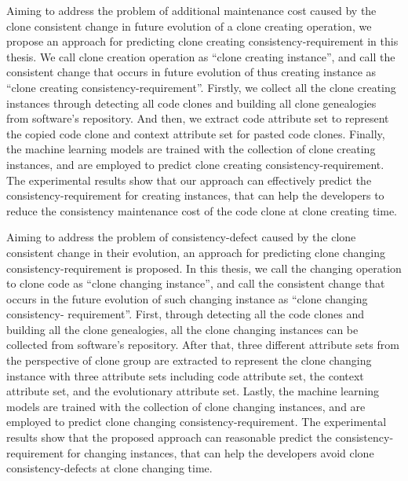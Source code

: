 {Aiming to address the problem of additional maintenance cost caused by the clone consistent change in future evolution of a clone creating operation, we propose an approach for predicting clone creating consistency-requirement in this thesis.
We call clone creation operation as ``clone creating instance'', and call the consistent change that occurs in future evolution of thus creating instance as ``clone creating consistency-requirement''.
Firstly, we collect all the clone creating instances through detecting all code clones and building all clone genealogies from software's repository.
And then, we extract code attribute set  to represent the copied code clone and context attribute set for pasted code clones.
Finally, the machine learning models are trained with the collection of clone creating instances, and are employed to predict clone creating consistency-requirement. 
The experimental results show that our approach can effectively predict the consistency-requirement for creating instances, that can help the developers to reduce the consistency maintenance cost of the code clone at clone creating time.

Aiming to address the problem of consistency-defect caused by the clone consistent change in their evolution, an approach for predicting clone changing consistency-requirement is proposed. 
In this thesis, we call the changing operation to clone code as ``clone changing instance'', and call the consistent change that occurs in the future evolution of such changing instance as ``clone changing consistency- requirement''.
First, through detecting all the code clones and building all the clone genealogies, all the clone changing instances can be collected  from software's repository.
After that, three different attribute sets from the perspective of clone group are extracted to represent the clone changing instance with three attribute sets including code attribute set, the context attribute set, and the evolutionary attribute set.
Lastly, the machine learning models are trained with the collection of clone changing instances, and are employed to predict clone changing consistency-requirement.
The experimental results show that the proposed approach can reasonable predict the consistency-requirement for changing instances, that can help the developers avoid clone consistency-defects at clone changing time.

}
